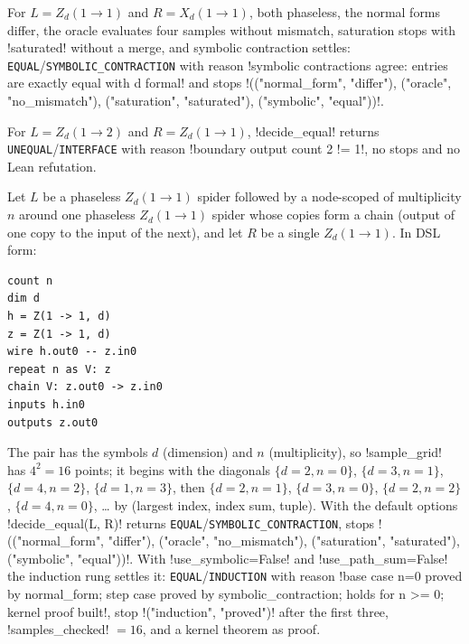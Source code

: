 \begin{example}
For $L=Z_d(1\to1)$ and $R=X_d(1\to1)$, both phaseless, the normal forms differ, the oracle evaluates four samples without mismatch, saturation stops with \code!saturated! without a merge, and symbolic contraction settles: \texttt{EQUAL}/\texttt{SYMBOLIC\_CONTRACTION} with reason \code!symbolic contractions agree: entries are exactly equal with d formal! and stops \code!(("normal_form", "differ"), ("oracle", "no_mismatch"), ("saturation", "saturated"), ("symbolic", "equal"))!.
\end{example}

\begin{example}
For $L=Z_d(1\to2)$ and $R=Z_d(1\to1)$, \py!decide_equal! returns \texttt{UNEQUAL}/\texttt{INTERFACE} with reason \code!boundary output count 2 != 1!, no stops and no Lean refutation.
\end{example}

\begin{example}
Let $L$ be a phaseless $Z_d(1\to1)$ spider followed by a node-scoped \bbox{} of multiplicity $n$ around one phaseless $Z_d(1\to1)$ spider whose copies form a chain (output of one copy to the input of the next), and let $R$ be a single $Z_d(1\to1)$. In DSL form:
\begin{lstlisting}[style=azx]
count n
dim d
h = Z(1 -> 1, d)
z = Z(1 -> 1, d)
wire h.out0 -- z.in0
repeat n as V: z
chain V: z.out0 -> z.in0
inputs h.in0
outputs z.out0
\end{lstlisting}
The pair has the symbols $d$ (dimension) and $n$ (multiplicity), so \py!sample_grid! has $4^2=16$ points; it begins with the diagonals $\{d{=}2,n{=}0\}$, $\{d{=}3,n{=}1\}$, $\{d{=}4,n{=}2\}$, $\{d{=}1,n{=}3\}$, then $\{d{=}2,n{=}1\}$, $\{d{=}3,n{=}0\}$, $\{d{=}2,n{=}2\}$, $\{d{=}4,n{=}0\}$, \ldots{} by (largest index, index sum, tuple). With the default options \py!decide_equal(L, R)! returns \texttt{EQUAL}/\texttt{SYMBOLIC\_CONTRACTION}, stops \code!(("normal_form", "differ"), ("oracle", "no_mismatch"), ("saturation", "saturated"), ("symbolic", "equal"))!. With \py!use_symbolic=False! and \py!use_path_sum=False! the induction rung settles it: \texttt{EQUAL}/\texttt{INDUCTION} with reason \code!base case n=0 proved by normal_form; step case proved by symbolic_contraction; holds for n >= 0; kernel proof built!, stop \code!("induction", "proved")! after the first three, \py!samples_checked! $=16$, and a kernel theorem as proof.
\end{example}
